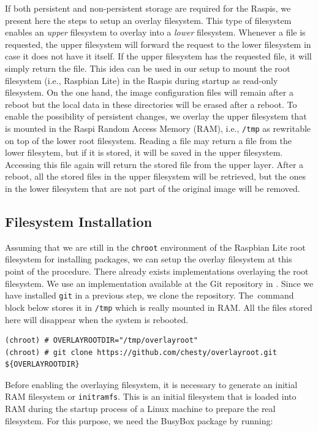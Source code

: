 \documentclass[electronics,article,accept,moreauthors,pdftex,10pt,a4paper]{mdpi}
\theoremstyle{mdpi}
\newcounter{ex}
\newcounter{re}
\theoremstyle{mdpidefinition}
\begin{document}
If both persistent and non-persistent storage are required for
the Raspis, we present here the steps to setup an overlay filesystem.
This type of filesystem enables an \textit{upper} filesystem to overlay
into a \textit{lower} filesystem. Whenever a file is requested, the upper
filesystem will forward the request to the lower filesystem in case it
does not have it itself. If the upper filesystem has the requested file,
it will simply return the file. This idea can be used in our setup to mount
the root filesystem (i.e., Raspbian Lite) in the Raspis during startup
as read-only filesystem. On the one hand, the image configuration files
will remain after a reboot but the local data in these directories will be
erased after a reboot. To enable the
possibility of persistent changes, we overlay the upper filesystem that is
mounted in the Raspi Random Access Memory (RAM), i.e., \texttt{/tmp} as rewritable
on top of the lower root filesystem. Reading a file may return a
file from the lower filesytem, but if it is stored, it will be saved in
the upper filesystem. Accessing this file again will return
the stored file from the upper layer. After a reboot, all the stored files
in the upper filesystem will be retrieved, but the ones in the lower
filesystem that are not part of the original image will be removed.

\subsection{Filesystem Installation}

Assuming that we are still in the \texttt{chroot} environment of the
Raspbian Lite root filesystem for installing packages, we can setup the
overlay filesystem at this point of the procedure. There already exists
implementations overlaying the root filesystem. We use an implementation
available at the Git repository in \cite{overlayroot}. Since we have
installed \texttt{git} in a previous step, we clone the repository. The~command block below stores it in \texttt{/tmp} which is really mounted in
RAM. All the files stored here will disappear when the system is
rebooted.

\begin{lstlisting}[]
(chroot) # OVERLAYROOTDIR="/tmp/overlayroot"
(chroot) # git clone https://github.com/chesty/overlayroot.git ${OVERLAYROOTDIR}
\end{lstlisting}
\FloatBarrier
\vspace{-5mm}

Before enabling the overlaying filesystem, it is necessary to generate
an initial RAM filesystem or \texttt{initramfs}. This is an
initial filesystem that is loaded into RAM during the startup
process of a Linux machine to prepare the real filesystem. For this purpose,
we need the BusyBox package by running:
\end{document}
